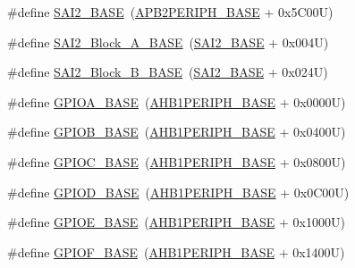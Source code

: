 \begin{DoxyCompactItemize}
\item 
\#define \hyperlink{group___peripheral__memory__map_ga4b4d5c95ea5f835f9ac37fab90a2d700}{S\+A\+I2\+\_\+\+B\+A\+SE}~(\hyperlink{group___peripheral__memory__map_ga25b99d6065f1c8f751e78f43ade652cb}{A\+P\+B2\+P\+E\+R\+I\+P\+H\+\_\+\+B\+A\+SE} + 0x5\+C00\+U)
\item 
\#define \hyperlink{group___peripheral__memory__map_gad2992b5770984ddee4c1b7e325d238f3}{S\+A\+I2\+\_\+\+Block\+\_\+\+A\+\_\+\+B\+A\+SE}~(\hyperlink{group___peripheral__memory__map_ga4b4d5c95ea5f835f9ac37fab90a2d700}{S\+A\+I2\+\_\+\+B\+A\+SE} + 0x004\+U)
\item 
\#define \hyperlink{group___peripheral__memory__map_ga034a6ac8f61e4d15cd9f2f7eca140569}{S\+A\+I2\+\_\+\+Block\+\_\+\+B\+\_\+\+B\+A\+SE}~(\hyperlink{group___peripheral__memory__map_ga4b4d5c95ea5f835f9ac37fab90a2d700}{S\+A\+I2\+\_\+\+B\+A\+SE} + 0x024\+U)
\item 
\#define \hyperlink{group___peripheral__memory__map_gad7723846cc5db8e43a44d78cf21f6efa}{G\+P\+I\+O\+A\+\_\+\+B\+A\+SE}~(\hyperlink{group___peripheral__memory__map_ga811a9a4ca17f0a50354a9169541d56c4}{A\+H\+B1\+P\+E\+R\+I\+P\+H\+\_\+\+B\+A\+SE} + 0x0000\+U)
\item 
\#define \hyperlink{group___peripheral__memory__map_gac944a89eb789000ece920c0f89cb6a68}{G\+P\+I\+O\+B\+\_\+\+B\+A\+SE}~(\hyperlink{group___peripheral__memory__map_ga811a9a4ca17f0a50354a9169541d56c4}{A\+H\+B1\+P\+E\+R\+I\+P\+H\+\_\+\+B\+A\+SE} + 0x0400\+U)
\item 
\#define \hyperlink{group___peripheral__memory__map_ga26f267dc35338eef219544c51f1e6b3f}{G\+P\+I\+O\+C\+\_\+\+B\+A\+SE}~(\hyperlink{group___peripheral__memory__map_ga811a9a4ca17f0a50354a9169541d56c4}{A\+H\+B1\+P\+E\+R\+I\+P\+H\+\_\+\+B\+A\+SE} + 0x0800\+U)
\item 
\#define \hyperlink{group___peripheral__memory__map_ga1a93ab27129f04064089616910c296ec}{G\+P\+I\+O\+D\+\_\+\+B\+A\+SE}~(\hyperlink{group___peripheral__memory__map_ga811a9a4ca17f0a50354a9169541d56c4}{A\+H\+B1\+P\+E\+R\+I\+P\+H\+\_\+\+B\+A\+SE} + 0x0\+C00\+U)
\item 
\#define \hyperlink{group___peripheral__memory__map_gab487b1983d936c4fee3e9e88b95aad9d}{G\+P\+I\+O\+E\+\_\+\+B\+A\+SE}~(\hyperlink{group___peripheral__memory__map_ga811a9a4ca17f0a50354a9169541d56c4}{A\+H\+B1\+P\+E\+R\+I\+P\+H\+\_\+\+B\+A\+SE} + 0x1000\+U)
\item 
\#define \hyperlink{group___peripheral__memory__map_ga7f9a3f4223a1a784af464a114978d26e}{G\+P\+I\+O\+F\+\_\+\+B\+A\+SE}~(\hyperlink{group___peripheral__memory__map_ga811a9a4ca17f0a50354a9169541d56c4}{A\+H\+B1\+P\+E\+R\+I\+P\+H\+\_\+\+B\+A\+SE} + 0x1400\+U)

\end{DoxyCompactItemize}
